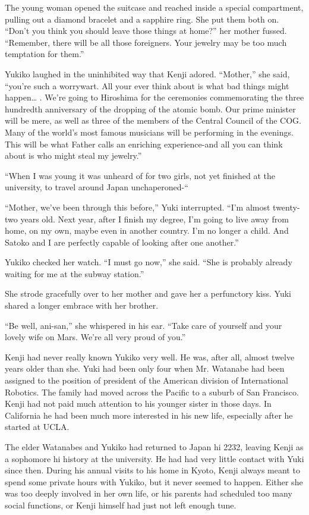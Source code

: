\documentclass[]{article}
\begin{document}
{The young woman opened the suitcase and reached inside a special compartment, pulling out a diamond bracelet and a sapphire ring.  She put them both on.  “Don’t you think you should leave those things at home?” her mother fussed.  “Remember, there will be all those foreigners.  Your jewelry may be too much temptation for them.”

Yukiko laughed in the uninhibited way that Kenji adored.  “Mother,” she said, “you’re such a worrywart.  All your ever think about is what bad things might happen… .  We’re going to Hiroshima for the ceremonies commemorating the three hundredth anniversary of the dropping of the atomic bomb.  Our prime minister will be mere, as well as three of the members of the Central Council of the COG.  Many of the world’s most famous musicians will be performing in the evenings.  This will be what Father calls an enriching experience-and all you can think about is who might steal my jewelry.”

“When I was young it was unheard of for two girls, not yet finished at the university, to travel around Japan unchaperoned-“

“Mother, we’ve been through this before,” Yuki interrupted.  “I’m almost twenty-two years old.  Next year, after I finish my degree, I’m going to live away from home, on my own, maybe even in another country.  I’m no longer a child.  And Satoko and I are perfectly capable of looking after one another.”

Yukiko checked her watch.  “I must go now,” she said.  “She is probably already waiting for me at the subway station.”

She strode gracefully over to her mother and gave her a perfunctory kiss.  Yuki shared a longer embrace with her brother.

“Be well, ani-san,” she whispered in his ear.  “Take care of yourself and your lovely wife on Mars.  We’re all very proud of you.”

Kenji had never really known Yukiko very well.  He was, after all, almost twelve years older than she.  Yuki had been only four when Mr.  Watanabe had been assigned to the position of president of the American division of International Robotics.  The family had moved across the Pacific to a suburb of San Francisco.  Kenji had not paid much attention to his younger sister in those days.  In California he had been much more interested in his new life, especially after he started at UCLA.

The elder Watanabes and Yukiko had returned to Japan hi 2232, leaving Kenji as a sophomore hi history at the university.  He had had very little contact with Yuki since then.  During his annual visits to his home in Kyoto, Kenji always meant to spend some private hours with Yukiko, but it never seemed to happen.  Either she was too deeply involved in her own life, or his parents had scheduled too many social functions, or Kenji himself had just not left enough tune.

}
\end{document}
